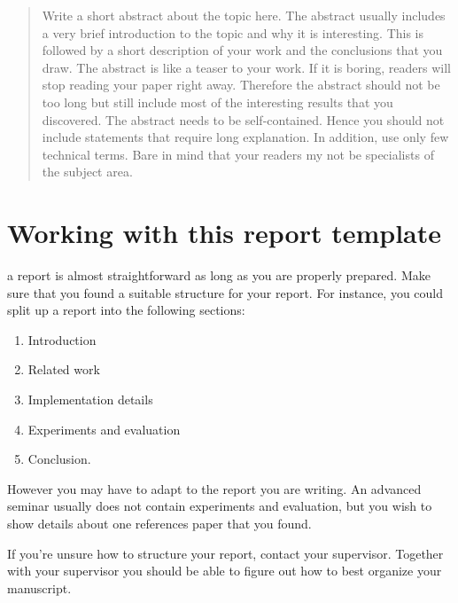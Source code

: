 \documentclass[10pt,a4paper,twoside,journal]{IEEEtran}
\begin{document}
\begin{abstract}
	Write a short abstract about the topic here. The abstract usually includes a
	very brief introduction to the topic and why it is interesting. This is
	followed by a short description of your work and the conclusions that you
	draw. The abstract is like a teaser to your work. If it is boring, readers
	will stop reading your paper right away. Therefore the abstract should not
	be too long but still include most of the interesting results that you
	discovered.
	The abstract needs to be self-contained. Hence you should not include
	statements that require long explanation. In addition, use only few
	technical terms. Bare in mind that your readers my not be specialists of
	the subject area.
\end{abstract}

%
%






\section{Working with this report template}

 a report is almost straightforward as long as you are
properly prepared. Make sure that you found a suitable structure for your
report. For instance, you could split up a report into the following sections:

\begin{enumerate}
	\item Introduction
	\item Related work
	\item Implementation details
	\item Experiments and evaluation
	\item Conclusion.
\end{enumerate}

However you may have to adapt to the report you are writing. An advanced seminar
usually does not contain experiments and evaluation, but you wish to show
details about one references paper that you found.

If you're unsure how to structure your report, contact your supervisor. Together
with your supervisor you should be able to figure out how to best organize your
manuscript.
\end{document}
